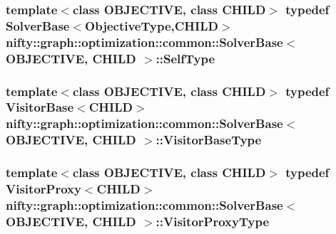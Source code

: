 \subsubsection[{Self\+Type}]{\setlength{\rightskip}{0pt plus 5cm}template$<$class O\+B\+J\+E\+C\+T\+I\+V\+E, class C\+H\+I\+L\+D$>$ typedef {\bf Solver\+Base}$<${\bf Objective\+Type},C\+H\+I\+L\+D$>$ {\bf nifty\+::graph\+::optimization\+::common\+::\+Solver\+Base}$<$ O\+B\+J\+E\+C\+T\+I\+V\+E, C\+H\+I\+L\+D $>$\+::{\bf Self\+Type}}\label{classnifty_1_1graph_1_1optimization_1_1common_1_1SolverBase_ae445fe93efdb410186debfa5a248dfad}
\hypertarget{classnifty_1_1graph_1_1optimization_1_1common_1_1SolverBase_a5a14d64c70a9cc0eebc7d71d2b089f9b}{}
\subsubsection[{Visitor\+Base\+Type}]{\setlength{\rightskip}{0pt plus 5cm}template$<$class O\+B\+J\+E\+C\+T\+I\+V\+E, class C\+H\+I\+L\+D$>$ typedef {\bf Visitor\+Base}$<$C\+H\+I\+L\+D$>$ {\bf nifty\+::graph\+::optimization\+::common\+::\+Solver\+Base}$<$ O\+B\+J\+E\+C\+T\+I\+V\+E, C\+H\+I\+L\+D $>$\+::{\bf Visitor\+Base\+Type}}\label{classnifty_1_1graph_1_1optimization_1_1common_1_1SolverBase_a5a14d64c70a9cc0eebc7d71d2b089f9b}
\hypertarget{classnifty_1_1graph_1_1optimization_1_1common_1_1SolverBase_a58913ea9ab9232ff72608b710c1012d0}{}
\subsubsection[{Visitor\+Proxy\+Type}]{\setlength{\rightskip}{0pt plus 5cm}template$<$class O\+B\+J\+E\+C\+T\+I\+V\+E, class C\+H\+I\+L\+D$>$ typedef {\bf Visitor\+Proxy}$<$C\+H\+I\+L\+D$>$ {\bf nifty\+::graph\+::optimization\+::common\+::\+Solver\+Base}$<$ O\+B\+J\+E\+C\+T\+I\+V\+E, C\+H\+I\+L\+D $>$\+::{\bf Visitor\+Proxy\+Type}}\label{classnifty_1_1graph_1_1optimization_1_1common_1_1SolverBase_a58913ea9ab9232ff72608b710c1012d0}


